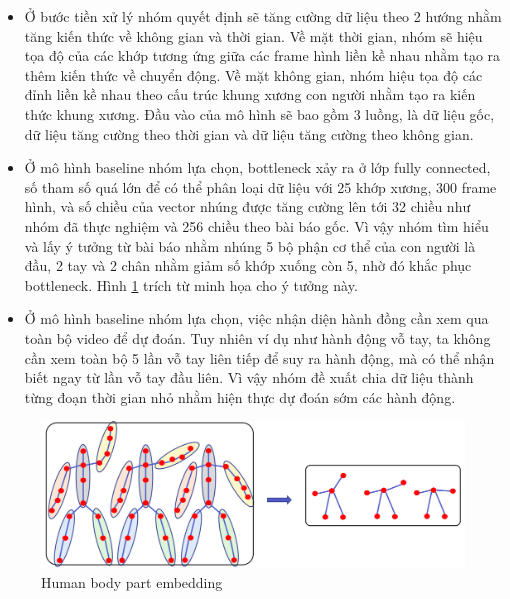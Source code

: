 \begin{itemize}
    \item Ở bước tiền xử lý nhóm quyết định sẽ tăng cường dữ liệu theo 2 hướng nhằm tăng kiến thức về không gian và thời gian. Về mặt thời gian, nhóm sẽ hiệu tọa độ của các khớp tương ứng giữa các frame hình liền kề nhau nhằm tạo ra thêm kiến thức về chuyển động. Về mặt không gian, nhóm hiệu tọa độ các đỉnh liền kề nhau theo cấu trúc khung xương con người nhằm tạo ra kiến thức khung xương. Đầu vào của mô hình sẽ bao gồm 3 luồng, là dữ liệu gốc, dữ liệu tăng cường theo thời gian và dữ liệu tăng cường theo không gian.
    \item Ở mô hình baseline nhóm lựa chọn, bottleneck xảy ra ở lớp fully connected, số tham số quá lớn để có thể phân loại dữ liệu với 25 khớp xương, 300 frame hình, và số chiều của vector nhúng được tăng cường lên tới 32 chiều như nhóm đã thực nghiệm và 256 chiều theo bài báo gốc. Vì vậy nhóm tìm hiểu và lấy ý tưởng từ bài báo \cite{song2020stronger} nhằm nhúng 5 bộ phận cơ thể của con người là đầu, 2 tay và 2 chân nhằm giảm số khớp xuống còn 5, nhờ đó khắc phục bottleneck. Hình \ref{fig:body-part-embedding} trích từ \cite{song2020stronger} minh họa cho ý tưởng này.
    \item Ở mô hình baseline nhóm lựa chọn, việc nhận diện hành đồng cần xem qua toàn bộ video để dự đoán. Tuy nhiên ví dụ như hành động vỗ tay, ta không cần xem toàn bộ 5 lần vỗ tay liên tiếp để suy ra hành động, mà có thể nhận biết ngay từ lần vỗ tay đầu liên. Vì vậy nhóm đề xuất chia dữ liệu thành từng đoạn thời gian nhỏ nhằm hiện thực dự đoán sớm các hành động.
\end{itemize}

\begin{figure}[!htp]
    \begin{center}
        \includegraphics[width=\linewidth]{asset/image/body_part_embedding.png}
        \caption{Human body part embedding}
        \label{fig:body-part-embedding}
    \end{center}
\end{figure}